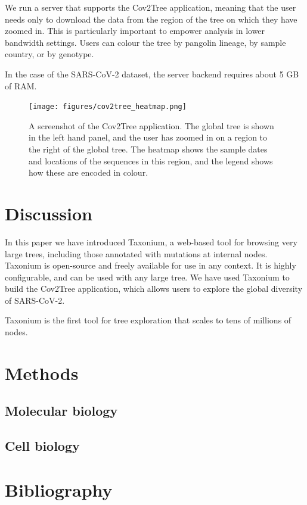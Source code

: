 We run a server that supports the Cov2Tree application, meaning that the user needs only to download the data from the region of the tree on which they have zoomed in. This is particularly important to empower analysis in lower bandwidth settings. Users can colour the tree by pangolin lineage, by sample country, or by genotype.

In the case of the SARS-CoV-2 dataset, the server backend requires about 5 GB of RAM.




\begin{figure}
\begin{center}
\texttt{[image: figures/cov2tree\_heatmap.png]}
\end{center}
\caption{
A screenshot of the Cov2Tree application. The global tree is shown in the left hand panel, and the user has zoomed in on a region to the right of the global tree. The heatmap shows the sample dates and locations of the sequences in this region, and the legend shows how these are encoded in colour.
}
\label{fig:cov2tree}
\end{figure}


\section*{Discussion}\label{s:discussion}

In this paper we have introduced Taxonium, a web-based tool for browsing very large trees, including those annotated with mutations at internal nodes. Taxonium is open-source and freely available for use in any context. It is highly configurable, and can be used with any large tree. We have used Taxonium to build the Cov2Tree application, which allows users to explore the global diversity of SARS-CoV-2.

Taxonium is the first tool for tree exploration that scales to tens of millions of nodes. 



\section*{Methods}\label{s:methods}

\subsection*{Molecular biology}

\subsection*{Cell biology}



\section*{Bibliography}

